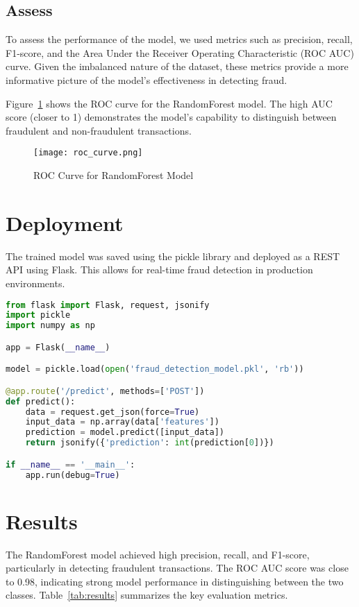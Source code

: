 \documentclass[12pt]{article}
\begin{document}
\subsection{Assess}
To assess the performance of the model, we used metrics such as precision, recall, F1-score, and the Area Under the Receiver Operating Characteristic (ROC AUC) curve. Given the imbalanced nature of the dataset, these metrics provide a more informative picture of the model's effectiveness in detecting fraud.

Figure~\ref{fig:roc_curve} shows the ROC curve for the RandomForest model. The high AUC score (closer to 1) demonstrates the model's capability to distinguish between fraudulent and non-fraudulent transactions.

\begin{figure}[H]
    \centering
    \texttt{[image: roc\_curve.png]}
    \caption{ROC Curve for RandomForest Model}
    \label{fig:roc_curve}
\end{figure}

\section{Deployment}
The trained model was saved using the pickle library and deployed as a REST API using Flask. This allows for real-time fraud detection in production environments.

\begin{lstlisting}[language=Python, caption=Flask API for Model Deployment]
from flask import Flask, request, jsonify
import pickle
import numpy as np

app = Flask(__name__)

model = pickle.load(open('fraud_detection_model.pkl', 'rb'))

@app.route('/predict', methods=['POST'])
def predict():
    data = request.get_json(force=True)
    input_data = np.array(data['features'])
    prediction = model.predict([input_data])
    return jsonify({'prediction': int(prediction[0])})

if __name__ == '__main__':
    app.run(debug=True)
\end{lstlisting}

\section{Results}
The RandomForest model achieved high precision, recall, and F1-score, particularly in detecting fraudulent transactions. The ROC AUC score was close to 0.98, indicating strong model performance in distinguishing between the two classes. Table~\ref{tab:results} summarizes the key evaluation metrics.
\end{document}
